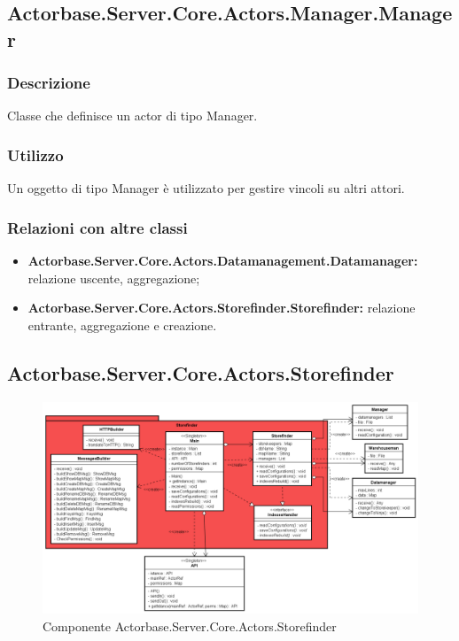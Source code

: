 \documentclass[a4paper]{article}
\begin{document}
		\subsection{Actorbase.Server.Core.Actors.Manager.Manager}
			\subsubsection{Descrizione}
				Classe che definisce un actor di tipo Manager.
			\subsubsection{Utilizzo}
				Un oggetto di tipo Manager è utilizzato per gestire vincoli su altri attori.
			\subsubsection{Relazioni con altre classi}
			\begin{itemize}
				\item \textbf{Actorbase.Server.Core.Actors.Datamanagement.Datamanager:} relazione uscente, aggregazione;
				\item \textbf{Actorbase.Server.Core.Actors.Storefinder.Storefinder:} relazione entrante, aggregazione e creazione.
			\end{itemize}
			
		\subsection{Actorbase.Server.Core.Actors.Storefinder}
			\begin{figure} [H]
			\centering
			\includegraphics[width=\textwidth]{Server/Package/StorefinderLevel.png}
			\caption{Componente Actorbase.Server.Core.Actors.Storefinder}
			\end{figure}
\end{document}
